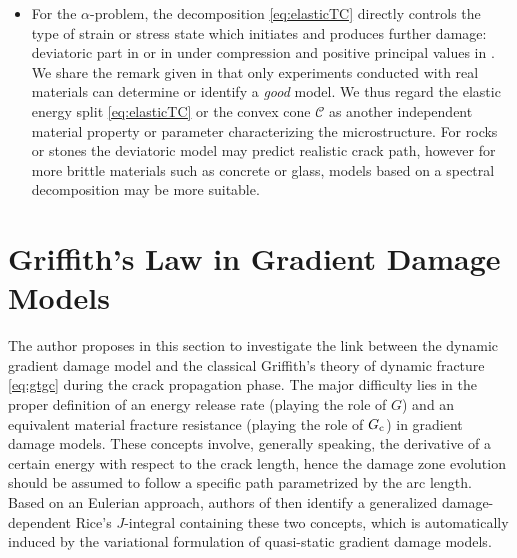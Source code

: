 \begin{itemize}
\item For the $\alpha$-problem, the decomposition \eqref{eq:elasticTC} directly controls the type of strain or stress state which initiates and produces further damage: deviatoric part in \cite{LancioniRoyer-Carfagni:2009} or in \cite{PhamAmorMarigoMaurini:2011} under compression and positive principal values in  \cite{MieheHofackerWelschinger:2010,FreddiRoyer-Carfagni:2010}. We share the remark given in \cite{AmbatiGerasimovLorenzis:2015} that only experiments conducted with real materials can determine or identify a \emph{good} model. We thus regard the elastic energy split \eqref{eq:elasticTC} or the convex cone $\mathcal{C}$ as another independent material property or parameter characterizing the microstructure. For rocks or stones the deviatoric model may predict realistic crack path, however for more brittle materials such as concrete or glass, models based on a spectral decomposition may be more suitable.
\end{itemize}

\section{Griffith's Law in Gradient Damage Models} \label{sec:linkDF}
The author proposes in this section to investigate the link between the dynamic gradient damage model and the classical Griffith's theory of dynamic fracture \eqref{eq:gtgc} during the crack propagation phase. The major difficulty lies in the proper definition of an energy release rate (playing the role of $G$) and an equivalent material fracture resistance (playing the role of $G_\mathrm{c}$) in gradient damage models. These concepts involve, generally speaking, the derivative of a certain energy with respect to the crack length, hence the damage zone evolution should be assumed to follow a specific path parametrized by the arc length. Based on an Eulerian approach, authors of \cite{SicsicMarigo:2013} then identify a generalized damage-dependent Rice's $J$-integral containing these two concepts, which is automatically induced by the variational formulation of quasi-static gradient damage models.

